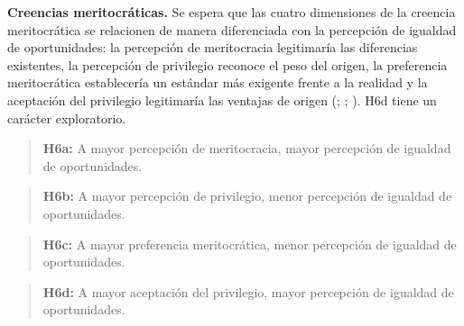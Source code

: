 \documentclass[
  spanish,
  a4paper,
  oneside]{scrbook}
\begin{document}
\textbf{Creencias meritocráticas.} Se espera que las cuatro dimensiones
de la creencia meritocrática se relacionen de manera diferenciada con la
percepción de igualdad de oportunidades: la percepción de meritocracia
legitimaría las diferencias existentes, la percepción de privilegio
reconoce el peso del origen, la preferencia meritocrática establecería
un estándar más exigente frente a la realidad y la aceptación del
privilegio legitimaría las ventajas de origen
(;
;
). H6d tiene un carácter
exploratorio.

\begin{quote}
\textbf{H6a:} A mayor percepción de meritocracia, mayor percepción de
igualdad de oportunidades.
\end{quote}

\begin{quote}
\textbf{H6b:} A mayor percepción de privilegio, menor percepción de
igualdad de oportunidades.
\end{quote}

\begin{quote}
\textbf{H6c:} A mayor preferencia meritocrática, menor percepción de
igualdad de oportunidades.
\end{quote}

\begin{quote}
\textbf{H6d:} A mayor aceptación del privilegio, mayor percepción de
igualdad de oportunidades.
\end{quote}
\end{document}
